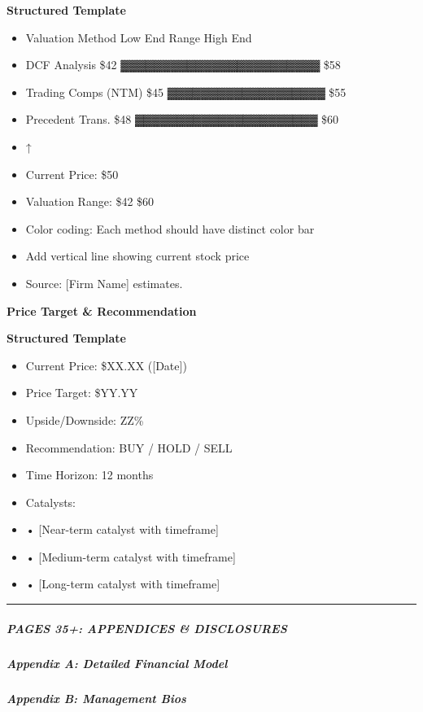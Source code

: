 \documentclass[11pt]{article}
\begin{document}
\textbf{Structured Template}
\begin{itemize}[leftmargin=*,itemsep=2pt,topsep=2pt]
\item {} Valuation Method Low End Range High End
\item {} DCF Analysis \$42 ▓▓▓▓▓▓▓▓▓▓▓▓▓▓▓▓▓▓▓▓▓▓▓▓ \$58
\item {} Trading Comps (NTM) \$45 ▓▓▓▓▓▓▓▓▓▓▓▓▓▓▓▓▓▓▓ \$55
\item {} Precedent Trans. \$48 ▓▓▓▓▓▓▓▓▓▓▓▓▓▓▓▓▓▓▓▓▓▓ \$60
\item {} ↑
\item {} Current Price: \$50
\item {} Valuation Range: \$42 \$60
\item {} Color coding: Each method should have distinct color bar
\item {} Add vertical line showing current stock price
\item {} Source: [Firm Name] estimates.
\end{itemize}

\textbf{Price Target \& Recommendation}

\textbf{Structured Template}
\begin{itemize}[leftmargin=*,itemsep=2pt,topsep=2pt]
\item {} Current Price: \$XX.XX ([Date])
\item {} Price Target: \$YY.YY
\item {} Upside/Downside: ZZ\%
\item {} Recommendation: BUY / HOLD / SELL
\item {} Time Horizon: 12 months
\item {} Catalysts:
\item {} • [Near-term catalyst with timeframe]
\item {} • [Medium-term catalyst with timeframe]
\item {} • [Long-term catalyst with timeframe]
\end{itemize}

\vspace{0.5em}\hrule\vspace{0.5em}

\subparagraph{PAGES 35+: APPENDICES \& DISCLOSURES}\mbox{}\par

\subparagraph{Appendix A: Detailed Financial Model}\mbox{}\par
[Reference to Excel model]


\subparagraph{Appendix B: Management Bios}\mbox{}\par
[Extended bios if not included in main text]
\end{document}
